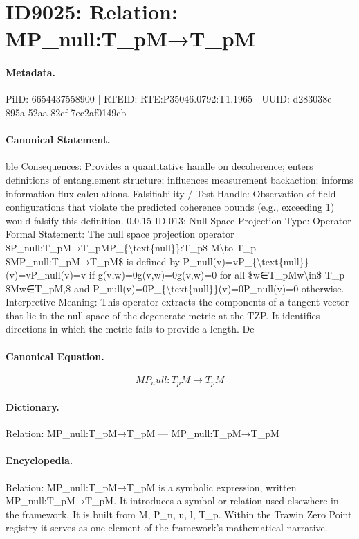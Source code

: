 \section*{ID9025: Relation: MP\_null:T\_pM→T\_pM}
\paragraph{Metadata.}
PiID: 6654437558900 | RTEID: RTE:P35046.0792:T1.1965 | UUID: d283038e-895a-52aa-82cf-7ec2af0149cb

\paragraph{Canonical Statement.}
ble Consequences: Provides a quantitative handle on decoherence; enters definitions of entanglement structure; influences measurement backaction; informs information flux calculations. Falsifiability / Test Handle: Observation of field configurations that violate the predicted coherence bounds (e.g., exceeding 1) would falsify this definition. 0.0.15 ID 013: Null Space Projection Type: Operator Formal Statement: The null space projection operator \$P\_null:T\_pM→T\_pMP\_\{\textbackslash{}text\{null\}\}:T\_p\$ M\textbackslash{}to T\_p \$MP\_null:T\_pM→T\_pM\$ is defined by P\_null(v)=vP\_\{\textbackslash{}text\{null\}\}(v)=vP\_null(v)=v if g(v,w)=0g(v,w)=0g(v,w)=0 for all \$w∈T\_pMw\textbackslash{}in\$ T\_p \$Mw∈T\_pM,\$ and P\_null(v)=0P\_\{\textbackslash{}text\{null\}\}(v)=0P\_null(v)=0 otherwise. Interpretive Meaning: This operator extracts the components of a tangent vector that lie in the null space of the degenerate metric at the TZP. It identifies directions in which the metric fails to provide a length. De

\paragraph{Canonical Equation.}
\[
MP_null:T_pM→T_pM
\]

\paragraph{Dictionary.}
Relation: MP\_null:T\_pM→T\_pM — MP\_null:T\_pM→T\_pM

\paragraph{Encyclopedia.}
Relation: MP\_null:T\_pM→T\_pM is a symbolic expression, written MP\_null:T\_pM→T\_pM. It introduces a symbol or relation used elsewhere in the framework. It is built from M, P\_n, u, l, T\_p. Within the Trawin Zero Point registry it serves as one element of the framework's mathematical narrative.
